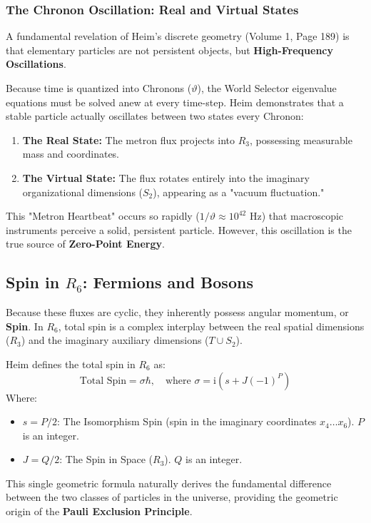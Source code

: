 \documentclass[11pt,a4paper,oneside]{article}
\newcommand{\iu}{\mathrm{i}}              %
\begin{document}
\subsubsection{The Chronon Oscillation: Real and Virtual States}
A fundamental revelation of Heim's discrete geometry (Volume 1, Page 189) is that elementary particles are not persistent objects, but \textbf{High-Frequency Oscillations}. 

Because time is quantized into Chronons ($\vartheta$), the World Selector eigenvalue equations must be solved anew at every time-step. Heim demonstrates that a stable particle actually oscillates between two states every Chronon:
\begin{enumerate}
    \item \textbf{The Real State:} The metron flux projects into $R_3$, possessing measurable mass and coordinates.
    \item \textbf{The Virtual State:} The flux rotates entirely into the imaginary organizational dimensions ($S_2$), appearing as a "vacuum fluctuation."
\end{enumerate}
This "Metron Heartbeat" occurs so rapidly ($1/\vartheta \approx 10^{42} \text{ Hz}$) that macroscopic instruments perceive a solid, persistent particle. However, this oscillation is the true source of \textbf{Zero-Point Energy}.

\subsection{Spin in \texorpdfstring{$R_6$}{R6}: Fermions and Bosons}
Because these fluxes are cyclic, they inherently possess angular momentum, or \textbf{Spin}. In $R_6$, total spin is a complex interplay between the real spatial dimensions ($R_3$) and the imaginary auxiliary dimensions ($T \cup S_2$). 

Heim defines the total spin in $R_6$ as:
\begin{equation}
    \text{Total Spin} = \sigma \hbar, \quad \text{where } \sigma = \iu(s + J(-1)^P)
\end{equation}
Where:
\begin{itemize}
    \item $s = P/2$: The Isomorphism Spin (spin in the imaginary coordinates $x_4 \dots x_6$). $P$ is an integer.
    \item $J = Q/2$: The Spin in Space ($R_3$). $Q$ is an integer.
\end{itemize}

This single geometric formula naturally derives the fundamental difference between the two classes of particles in the universe, providing the geometric origin of the \textbf{Pauli Exclusion Principle}.
\end{document}
